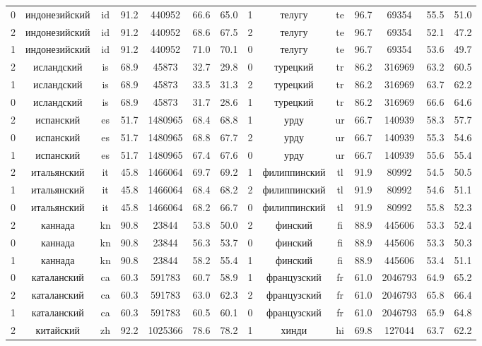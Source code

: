 \begin{table*}
{\begin{tabular}{|c|c|c|c|c|c|c|||c|c|c|c|c|c|c|}
0 & индонезийский & id & 91.2 & 440952 & 66.6 & 65.0 & 1 & телугу & te & 96.7 & 69354 & 55.5 & 51.0\\
2 & индонезийский & id & 91.2 & 440952 & 68.6 & 67.5 & 2 & телугу & te & 96.7 & 69354 & 52.1 & 47.2\\
1 & индонезийский & id & 91.2 & 440952 & 71.0 & 70.1 & 0 & телугу & te & 96.7 & 69354 & 53.6 & 49.7\\
2 & исландский & is & 68.9 & 45873 & 32.7 & 29.8 & 0 & турецкий & tr & 86.2 & 316969 & 63.2 & 60.5\\
1 & исландский & is & 68.9 & 45873 & 33.5 & 31.3 & 2 & турецкий & tr & 86.2 & 316969 & 63.7 & 62.2\\
0 & исландский & is & 68.9 & 45873 & 31.7 & 28.6 & 1 & турецкий & tr & 86.2 & 316969 & 66.6 & 64.6\\
2 & испанский & es & 51.7 & 1480965 & 68.4 & 68.8 & 1 & урду & ur & 66.7 & 140939 & 58.3 & 57.7\\
0 & испанский & es & 51.7 & 1480965 & 68.8 & 67.7 & 2 & урду & ur & 66.7 & 140939 & 55.3 & 54.6\\
1 & испанский & es & 51.7 & 1480965 & 67.4 & 67.6 & 0 & урду & ur & 66.7 & 140939 & 55.6 & 55.4\\
2 & итальянский & it & 45.8 & 1466064 & 69.7 & 69.2 & 1 & филиппинский & tl & 91.9 & 80992 & 54.5 & 50.5\\
1 & итальянский & it & 45.8 & 1466064 & 68.4 & 68.2 & 2 & филиппинский & tl & 91.9 & 80992 & 54.6 & 51.1\\
0 & итальянский & it & 45.8 & 1466064 & 68.2 & 66.7 & 0 & филиппинский & tl & 91.9 & 80992 & 55.8 & 52.3\\
2 & каннада & kn & 90.8 & 23844 & 53.8 & 50.0 & 2 & финский & fi & 88.9 & 445606 & 53.3 & 52.4\\
0 & каннада & kn & 90.8 & 23844 & 56.3 & 53.7 & 0 & финский & fi & 88.9 & 445606 & 53.3 & 50.3\\
1 & каннада & kn & 90.8 & 23844 & 58.2 & 55.4 & 1 & финский & fi & 88.9 & 445606 & 53.4 & 51.1\\
0 & каталанский & ca & 60.3 & 591783 & 60.7 & 58.9 & 1 & французский & fr & 61.0 & 2046793 & 64.9 & 65.2\\
2 & каталанский & ca & 60.3 & 591783 & 63.0 & 62.3 & 2 & французский & fr & 61.0 & 2046793 & 65.8 & 66.4\\
1 & каталанский & ca & 60.3 & 591783 & 60.5 & 60.1 & 0 & французский & fr & 61.0 & 2046793 & 65.9 & 64.8\\
2 & китайский & zh & 92.2 & 1025366 & 78.6 & 78.2 & 1 & хинди & hi & 69.8 & 127044 & 63.7 & 62.2\\

\end{tabular}}
\end{table*}
